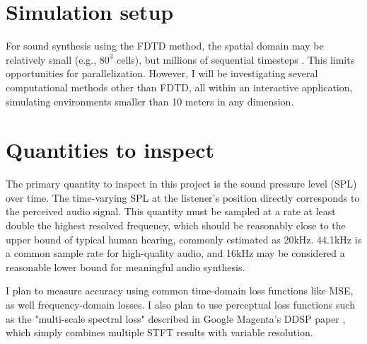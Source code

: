 \documentclass[12pt]{article}
\begin{document}
\section{Simulation setup}

For sound synthesis using the FDTD method, the spatial domain may be relatively small (e.g., $80^3$ cells), but millions of sequential timesteps \cite{wang_wbss_2018}.
This limits opportunities for parallelization.
However, I will be investigating several computational methods other than FDTD, all within an interactive application, simulating environments smaller than 10 meters in any dimension.

\section{Quantities to inspect}

The primary quantity to inspect in this project is the sound pressure level (SPL) over time.
The time-varying SPL at the listener's position directly corresponds to the perceived audio signal.
This quantity must be sampled at a rate at least double the highest resolved frequency, which should be reasonably close to the upper bound of typical human hearing, commonly estimated as 20kHz.
44.1kHz is a common sample rate for high-quality audio, and 16kHz may be considered a reasonable lower bound for meaningful audio synthesis.

I plan to measure accuracy using common time-domain loss functions like MSE, as well frequency-domain losses.
I also plan to use perceptual loss functions such as the "multi-scale spectral loss" described in Google Magenta's DDSP paper \cite{engel_ddsp_2020}, which simply combines multiple STFT results with variable resolution.



\end{document}
